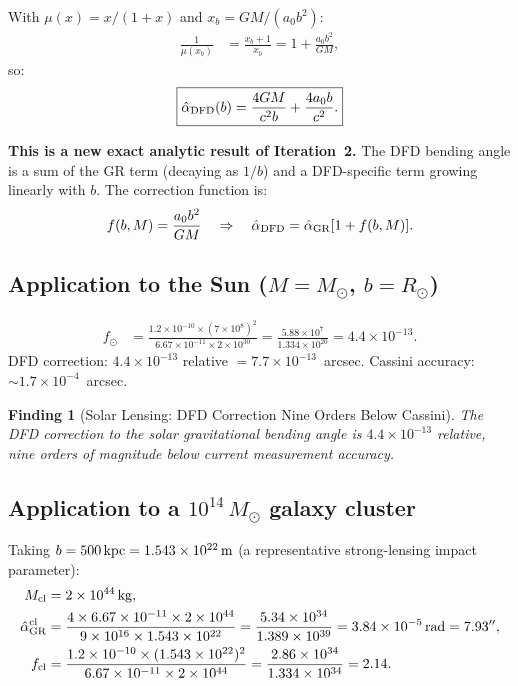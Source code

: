 \documentclass[11pt]{article}
\newtheorem{finding}{Finding}
\newcommand{\ee}[1]{\times 10^{#1}}
\begin{document}
With $\mu(x) = x/(1+x)$ and $x_b = GM/(a_0 b^2)$:
\begin{align}
  \frac{1}{\mu(x_b)} &= \frac{x_b + 1}{x_b}
  = 1 + \frac{a_0 b^2}{GM},
\end{align}
so:
\begin{equation}\label{eq:exact-lensing}
  \boxed{\hat\alpha_{\rm DFD}(b)
  = \frac{4GM}{c^2 b} + \frac{4a_0 b}{c^2}.}
\end{equation}

\textbf{This is a new exact analytic result of Iteration~2.}  The DFD
bending angle is a sum of the GR term (decaying as $1/b$) and a
DFD-specific term growing linearly with $b$.  The correction function is:
\begin{equation}
  f(b, M) = \frac{a_0 b^2}{GM} \quad\Rightarrow\quad
  \hat\alpha_{\rm DFD} = \hat\alpha_{\rm GR}[1 + f(b,M)].
\end{equation}

\subsection{Application to the Sun ($M = M_\odot$, $b = R_\odot$)}

\begin{align}
  f_\odot &= \frac{1.2\ee{-10}\times(7\ee{8})^2}{6.67\ee{-11}\times 2\ee{30}}
  = \frac{5.88\ee{7}}{1.334\ee{20}} = 4.4\ee{-13}.
\end{align}
DFD correction: $4.4\ee{-13}$ relative $= 7.7\ee{-13}$~arcsec.
Cassini accuracy: $\sim 1.7\ee{-4}$~arcsec.

\begin{finding}[Solar Lensing: DFD Correction Nine Orders Below Cassini]
The DFD correction to the solar gravitational bending angle is
$4.4\ee{-13}$ relative, nine orders of magnitude below current measurement
accuracy.
\end{finding}

\subsection{Application to a $10^{14}\,M_\odot$ galaxy cluster}

Taking $b = 500\,{\rm kpc} = 1.543\ee{22}\,{\rm m}$ (a representative
strong-lensing impact parameter):
\begin{align}
  M_{\rm cl} &= 2\ee{44}\,{\rm kg},\\
  \hat\alpha_{\rm GR}^{\rm cl}
  &= \frac{4\times 6.67\ee{-11}\times 2\ee{44}}{9\ee{16}\times 1.543\ee{22}}
  = \frac{5.34\ee{34}}{1.389\ee{39}} = 3.84\ee{-5}\,{\rm rad} = 7.93'',\\
  f_{\rm cl}
  &= \frac{1.2\ee{-10}\times(1.543\ee{22})^2}{6.67\ee{-11}\times 2\ee{44}}
  = \frac{2.86\ee{34}}{1.334\ee{34}} = 2.14.
\end{align}
\end{document}
